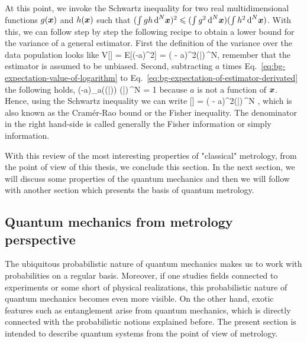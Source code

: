 At this point, we invoke the Schwartz inequality for two real multidimensional functions $g(\boldsymbol{x})$ and $h(\boldsymbol{x})$ such that $(\int g h \,\text{d}^N\boldsymbol{x})^2\leqslant (\int g^2 \,\text{d}^N\boldsymbol{x}) (\int h^2 \,\text{d}^N\boldsymbol{x})$.
With this, we can follow step by step the following recipe to obtain a lower bound for the variance of a general estimator.
First the definition of the variance over the data population looks like
\be
  V[] = E[(-a)^2] = \int ( - a)^2\prob(|)\,^N,
\ee
remember that the estimator is assumed to be unbiased.
Second, subtracting $a$ times Eq.~\eqref{eq:bg-expectation-value-of-logarithm} to Eq.~\eqref{eq:bg-expectation-of-estimator-derivated} the following holds,
\be
  \int (-a)\partial_a\big(\ln  \prob(|)\big) \prob(|)\,^N = 1
\ee
because $a$ is not a function of $\boldsymbol{x}$.
Hence, using the Schwartz inequality we can write
\be
  \label{eq:bg-classical-cr-bound-and-fi}
  [] = \int ( - a)^2\prob(|)\,^N \geqslant {},
\ee
which is also known as the Cram\'er-Rao bound or the Fisher inequality.
The denominator in the right hand-side is called generally the Fisher information or simply information.

With this review of the most interesting properties of "classical" metrology, from the point of view of this thesis, we conclude this section.
In the next section, we will discuss some properties of the quantum mechanics and then we will follow with another section which presents the basis of quantum metrology.

\subsection{Quantum mechanics from metrology perspective}
\label{sec:bg-quantum-mechanics-for-metrology}

The ubiquitous probabilistic nature of quantum mechanics makes us to work with probabilities on a regular basis.
Moreover, if one studies fields connected to experiments or some short of physical realizations, this probabilistic nature of quantum mechanics becomes even more visible.
On the other hand, exotic features such as entanglement arise from quantum mechanics, which is directly connected with the probabilistic notions explained before.
The present section is intended to describe quantum systems from the point of view of metrology.


